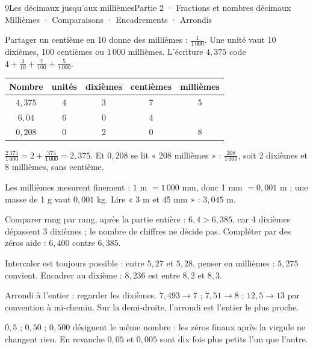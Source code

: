 \begin{ouverture}[calcul]{9}{Les décimaux jusqu’aux millièmes}{Partie 2 · Fractions et nombres décimaux}
{Millièmes · Comparaisons · Encadrements · Arrondis}
\end{ouverture}
\pagestyle{otMain}\essentiel\fontsize{11}{15}\selectfont
{}\label{cours-9-1}
\begin{definition}Partager un centième en 10 donne des millièmes : $\frac1{1\,000}$. Une unité vaut 10 dixièmes, 100 centièmes ou $1\,000$ millièmes. L’écriture $4{,}375$ code $4+\frac3{10}+\frac7{100}+\frac5{1\,000}$.\end{definition}\begin{center}\renewcommand{\arraystretch}{1.35}\begin{tabular}{c|cccc}\toprule
Nombre & unités & dixièmes & centièmes & millièmes\\\midrule
$4{,}375$ & 4 & 3 & 7 & 5\\
$6{,}04$ & 6 & 0 & 4 & \\
$0{,}208$ & 0 & 2 & 0 & 8\\
\bottomrule\end{tabular}\end{center}
\begin{exemple}$\frac{2\,375}{1\,000}=2+\frac{375}{1\,000}=2{,}375$. Et $0{,}208$ se lit « 208 millièmes » : $\frac{208}{1\,000}$, soit 2 dixièmes et 8 millièmes, sans centième.\end{exemple}
\begin{savoirfaire}Les millièmes mesurent finement : $1$ m $=1\,000$ mm, donc 1 mm $=0{,}001$ m ; une masse de 1 g vaut $0{,}001$ kg. Lire « 3 m et 45 mm » : $3{,}045$ m.\end{savoirfaire}
\clearpage
{}\label{cours-9-2}
\begin{propriete}Comparer rang par rang, après la partie entière : $6{,}4>6{,}385$, car 4 dixièmes dépassent 3 dixièmes ; le nombre de chiffres ne décide pas. Compléter par des zéros aide : $6{,}400$ contre $6{,}385$.\end{propriete}
\begin{savoirfaire}Intercaler est toujours possible : entre $5{,}27$ et $5{,}28$, penser en millièmes : $5{,}275$ convient. Encadrer au dixième : $8{,}236$ est entre $8{,}2$ et $8{,}3$.\end{savoirfaire}
\begin{exemple}Arrondi à l’entier : regarder les dixièmes. $7{,}493\to7$ ; $7{,}51\to8$ ; $12{,}5\to13$ par convention à mi-chemin. Sur la demi-droite, l’arrondi est l’entier le plus proche.\end{exemple}
\begin{attention}$0{,}5$ ; $0{,}50$ ; $0{,}500$ désignent le même nombre : les zéros finaux après la virgule ne changent rien. En revanche $0{,}05$ et $0{,}005$ sont dix fois plus petits l’un que l’autre.\end{attention}

